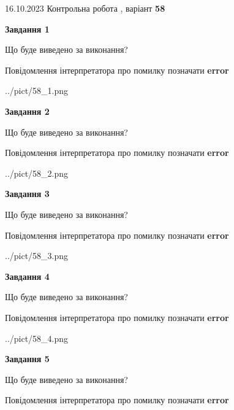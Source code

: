 \documentclass[12pt, ukrainian]{article}
\begin{document}
{\Large{16.10.2023 Контрольна робота , варіант  \No \textbf { 58 }\par}}
{
\begin {large}
{\begin {center}\textbf{Завдання 1}\end {center}}\par
Що буде виведено за виконання? \par
Повідомлення інтерпретатора про помилку позначати \textbf{error}

\begin{center}
	{../pict/58_1.png}
\end{center}
\newpage

{\begin {center}\textbf{Завдання 2}\end {center}}\par
Що буде виведено за виконання? \par
Повідомлення інтерпретатора про помилку позначати \textbf{error}

\begin{center}
	{../pict/58_2.png}
\end{center}
\newpage

{\begin {center}\textbf{Завдання 3}\end {center}}\par
Що буде виведено за виконання? \par
Повідомлення інтерпретатора про помилку позначати \textbf{error}

\begin{center}
	{../pict/58_3.png}
\end{center}
\newpage

{\begin {center}\textbf{Завдання 4}\end {center}}\par
Що буде виведено за виконання? \par
Повідомлення інтерпретатора про помилку позначати \textbf{error}

\begin{center}
	{../pict/58_4.png}
\end{center}
\newpage

{\begin {center}\textbf{Завдання 5}\end {center}}\par
Що буде виведено за виконання? \par
Повідомлення інтерпретатора про помилку позначати \textbf{error}


\end{large}}
\end{document}
